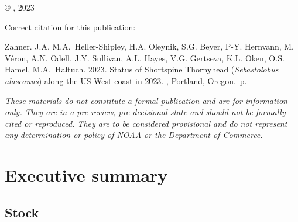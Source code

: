 \documentclass[11pt,
  english,
  letterpaper,
]{article}
\newcommand{\trTitle}{Status of Shortspine Thornyhead (\emph{Sebastolobus alascanus}) along the US West coast in 2023}
\newcommand{\trYear}{2023}
\newcommand{\trAuthsBack}{Zahner. J.A, M.A.~Heller-Shipley, H.A. Oleynik, S.G. Beyer, P-Y. Hernvann, M. Véron, A.N. Odell, J.Y. Sullivan, A.L. Hayes, V.G. Gertseva, K.L. Oken, O.S. Hamel, M.A.~Haltuch}
\newcommand{\trCitation}{
\begin{hangparas}{1em}{1}
\trAuthsBack{}. \trYear{}. \trTitle{}. \glsentrylong{pfmc}, Portland, Oregon. \pageref{LastPage}{}\,p.
\end{hangparas}}
\begin{document}
\thispagestyle{empty}
\vspace*{\fill}
\begin{center}
\copyright{} , \trYear{}\\
\end{center}
\par
\bigskip
\noindent
Correct citation for this publication:
\bigskip
\par
\trCitation{}
\clearpage


\tableofcontents\clearpage
\label{TRlastRoman}
\clearpage

\newpage
\thispagestyle{empty} %

\pagestyle{plain}  %
\renewcommand*{\thefootnote}{\arabic{footnote}}  %
\setcounter{footnote}{0}  %
\renewcommand{\headrulewidth}{0.5pt}
\renewcommand{\footrulewidth}{0.5pt}

\newcommand{\lt}{\ensuremath <}
\newcommand{\gt}{\ensuremath >}

\emph{These materials do not constitute a formal publication and are for information only. They are in a pre-review, pre-decisional state and should not be formally cited or reproduced. They are to be considered provisional and do not represent any determination or policy of NOAA or the Department of Commerce.}

\pagebreak
{}
\setcounter{page}{1}

\renewcommand{\thetable}{\roman{table}}
\renewcommand{\thefigure}{\roman{figure}}

\setlength\parskip{0.5em plus 0.1em minus 0.2em}

\hypertarget{executive-summary}{%
\section*{Executive summary}\label{executive-summary}}

\hypertarget{stock}{%
\subsection*{Stock}\label{stock}}
\end{document}
